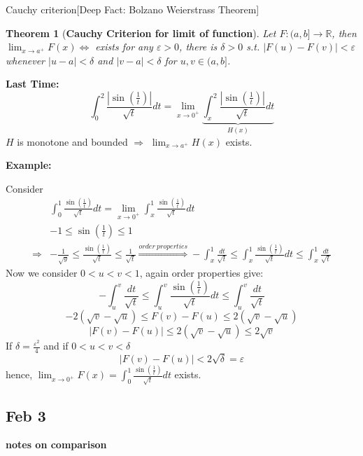 \documentclass[12pt]{article}
\theoremstyle{plain}
\newtheorem{theorem}{Theorem}[subsection]
\newcommand{\abs}[1]{\left| #1 \right|}
\newcommand{\mR}{{\mathbb{R}}}
\newcommand{\ep}{\varepsilon}
\begin{document}
	Cauchy criterion[Deep Fact: Bolzano Weierstrass Theorem]\\

	\begin{theorem}[\textbf{Cauchy Criterion for limit of function}]
		Let $F:(a,b]\to \mR$, then 
		$\lim_{x\to a^+} F(x) \Leftrightarrow$ exists
		for any $\ep>0$, there is $\delta > 0$ s.t. $\abs{F(u)-F(v)}<\ep$
		whenever $\abs{u-a}<\delta$ and $\abs{v-a}<\delta$ for $u,v \in (a,b]$.
	\end{theorem}
	

	\textbf{Last Time: } 
	\[
		\int_0^2 \frac{\abs{\sin (\frac 1t)}}{\sqrt t} dt =\lim_{x\to 0^+}
		\underbrace{\int_x^2 \frac{\abs{\sin (\frac 1t)}}{\sqrt t} dt}_{H(x)}
	\]
	$H$ is monotone and bounded $\Rightarrow$ $\lim_{x\to a^+} H(x)$ exists. \\


	{\color{Brown}
	\textbf{Example: }

	Consider 
	\begin{align*}
		&\int_0^1 \frac{\sin (\frac 1t)}{\sqrt t} dt = \lim_{x\to 0^+} 
		\int_x^1 \frac{\sin(\frac 1t)}{\sqrt t} dt\\ 
		&-1 \leq \sin (\frac 1t) \leq 1 \\
		\Rightarrow & -\frac1{\sqrt y} \leq \frac{\sin(\frac 1t)}{\sqrt t}
		\leq \frac1{\sqrt t} 
		\overset{order\ properties}{\Rightarrow} -\int_x^1 \frac{dt}{\sqrt t}
		\leq \int_x^1 \frac{\sin(\frac 1t)}{\sqrt t} dt
		\leq \int_x^1 \frac{dt}{\sqrt t}
	\end{align*}
	Now we consider $0< u< v < 1$, again order properties give:
	\[
		-\int_u^v \frac{dt}{\sqrt t} 
		\leq \int_u^v \frac{\sin(\frac 1t)}{\sqrt t} dt
		\leq \int_u^v \frac{dt}{\sqrt t}
	\]
	\[
		-2(\sqrt v- \sqrt u) \leq F(v) - F(u) \leq 2 (\sqrt v - \sqrt u)
	\]
	\[	
		\abs{F(v) - F(u)} \leq 2 (\sqrt v - \sqrt u) \leq 2\sqrt v
	\]
	If $\delta = \frac{\ep^2}{4}$ and if $0<u<v<\delta$
	\[
		\abs{F(v) - F(u)} < 2\sqrt{\delta} = \ep
	\]
	hence, $\lim_{x\to 0 ^+}F(x)=\int_0^1 \frac{\sin(\frac 1t)}{\sqrt t}dt$
	exists. 
	}

	
	\subsection{Feb 3}

	\textbf{notes on comparison}
	
\end{document}
